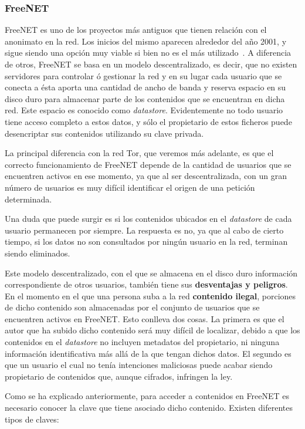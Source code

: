 \subsubsection {FreeNET}

FreeNET es uno de los proyectos más antiguos que tienen relación con el anonimato en la red. Los inicios del mismo aparecen alrededor del año 2001, y sigue siendo una opción muy viable si bien no es el más utilizado~\cite{article:freenet}. A diferencia de otros, FreeNET se basa en un modelo descentralizado, es decir, que no existen servidores para controlar ó gestionar la red y en su lugar cada usuario que se conecta a ésta aporta una cantidad de ancho de banda y reserva espacio en su disco duro para almacenar parte de los contenidos que se encuentran en dicha red. 
Este espacio es conocido como \textit{datastore}. Evidentemente no todo usuario tiene acceso completo a estos datos, y sólo el propietario de estos ficheros puede desencriptar sus contenidos utilizando su clave privada.

La principal diferencia con la red Tor, que veremos más adelante, es que el correcto funcionamiento de FreeNET depende de la cantidad de usuarios que se encuentren activos en ese momento, ya que al ser descentralizada, con un gran número de usuarios es muy difícil identificar el origen de una petición determinada. 

Una duda que puede surgir es si los contenidos ubicados en el \textit{datastore} de cada usuario permanecen por siempre. La respuesta es no, ya que al cabo de cierto tiempo, si los datos no son consultados por ningún usuario en la red, terminan siendo eliminados.

Este modelo descentralizado, con el que se almacena en el disco duro información correspondiente de otros usuarios, también tiene sus \textbf{desventajas y peligros}. En el momento en el que una persona suba a la red \textbf{contenido ilegal}, porciones de dicho contenido son almacenadas por el conjunto de usuarios que se encuentren activos en FreeNET. Esto conlleva dos cosas.
La primera es que el autor que ha subido dicho contenido será muy difícil de localizar, debido a que los contenidos en el \textit{datastore} no incluyen metadatos del propietario, ni ninguna información identificativa más allá de la que tengan dichos datos.
El segundo es que un usuario el cual no tenía intenciones maliciosas puede acabar siendo propietario de contenidos que, aunque cifrados, infringen la ley.

Como se ha explicado anteriormente, para acceder a contenidos en FreeNET es necesario conocer la clave que tiene asociado dicho contenido. Existen diferentes tipos de claves:


